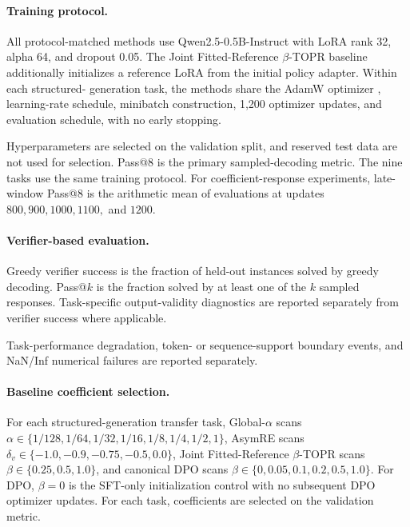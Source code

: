 \documentclass{article}
\theoremstyle{plain}
\theoremstyle{definition}
\theoremstyle{remark}
\begin{document}
\paragraph{Training protocol.}

All protocol-matched methods use Qwen2.5-0.5B-Instruct
\citep{qwen2024qwen25} with LoRA rank 32, alpha 64, and dropout 0.05. The
Joint Fitted-Reference \(\beta\)-TOPR baseline additionally initializes a
reference LoRA from the initial policy adapter. Within each structured-
generation task, the methods share the AdamW optimizer
\citep{loshchilov2019decoupled}, learning-rate schedule, minibatch
construction, 1,200 optimizer updates, and evaluation schedule, with no early
stopping.

Hyperparameters are selected on the validation split,
and reserved test data are not used for selection. Pass@8 is the primary
sampled-decoding metric. The nine tasks use the same training protocol. For
coefficient-response experiments, late-window Pass@8 is the arithmetic mean of
evaluations at updates \(800,900,1000,1100,\) and \(1200\).

\paragraph{Verifier-based evaluation.}

Greedy verifier success is the fraction of held-out instances solved by
greedy decoding. Pass@$k$ is the fraction solved by at least one of
the \(k\) sampled responses. Task-specific output-validity
diagnostics are reported separately from verifier success where applicable.

Task-performance degradation, token- or sequence-support boundary events,
and NaN/Inf numerical failures are reported separately.



\paragraph{Baseline coefficient selection.}
For each structured-generation transfer task, Global-\(\alpha\) scans
\(\alpha\in\{1/128,1/64,1/32,1/16,1/8,1/4,1/2,1\}\),
AsymRE scans
\(\delta_v\in\{-1.0,-0.9,-0.75,-0.5,0.0\}\), Joint Fitted-Reference
\(\beta\)-TOPR scans \(\beta\in\{0.25,0.5,1.0\}\), and canonical DPO
scans \(\beta\in\{0,0.05,0.1,0.2,0.5,1.0\}\). For DPO, \(\beta=0\)
is the SFT-only initialization control with no subsequent DPO optimizer
updates. For each task, coefficients are selected on the validation metric.
\end{document}
